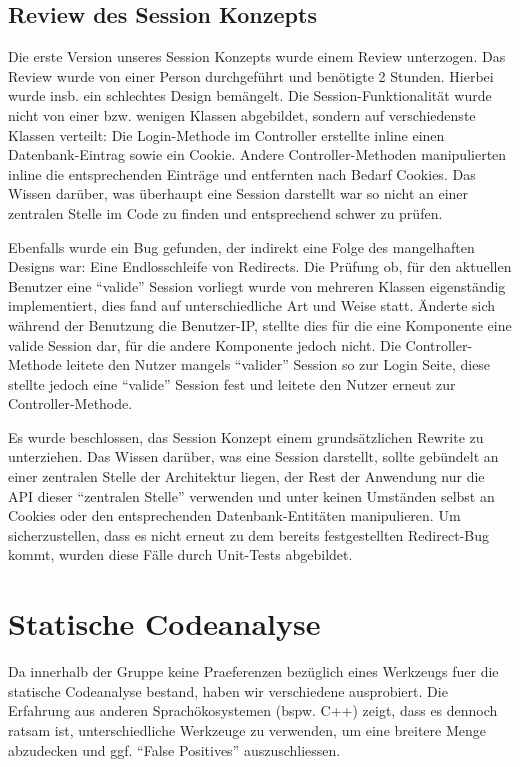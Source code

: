 \documentclass[12pt,DIV14,BCOR10mm,a4paper,twoside,parskip=half-,headsepline,headinclude,english,ngerman,bibliography=totocnumbered]{scrreprt}
\begin{document}
\subsection{Review des Session Konzepts}
Die erste Version unseres Session Konzepts wurde einem Review unterzogen. Das Review wurde von einer Person durchgeführt und benötigte 2 Stunden. Hierbei wurde insb. ein schlechtes Design bemängelt. Die Session-Funktionalität wurde nicht von einer bzw. wenigen Klassen abgebildet, sondern auf verschiedenste Klassen verteilt: Die Login-Methode im Controller erstellte inline einen Datenbank-Eintrag sowie ein Cookie. Andere Controller-Methoden manipulierten inline die entsprechenden Einträge und entfernten nach Bedarf Cookies. Das Wissen darüber, was überhaupt eine Session darstellt war so nicht an einer zentralen Stelle im Code zu finden und entsprechend schwer zu prüfen.

Ebenfalls wurde ein Bug gefunden, der indirekt eine Folge des mangelhaften Designs war: Eine Endlosschleife von Redirects. Die Prüfung ob, für den aktuellen Benutzer eine ``valide'' Session vorliegt wurde von mehreren Klassen eigenständig implementiert, dies fand auf unterschiedliche Art und Weise statt. Änderte sich während der Benutzung die Benutzer-IP, stellte dies für die eine Komponente eine valide Session dar, für die andere Komponente jedoch nicht. Die Controller-Methode leitete den Nutzer mangels ``valider'' Session so zur Login Seite, diese stellte jedoch eine ``valide'' Session fest und leitete den Nutzer erneut zur Controller-Methode.

Es wurde beschlossen, das Session Konzept einem grundsätzlichen Rewrite zu unterziehen. Das Wissen darüber, was eine Session darstellt, sollte gebündelt an einer zentralen Stelle der Architektur liegen, der Rest der Anwendung nur die API dieser ``zentralen Stelle'' verwenden und unter keinen Umständen selbst an Cookies oder den entsprechenden Datenbank-Entitäten manipulieren. Um sicherzustellen, dass es nicht erneut zu dem bereits festgestellten Redirect-Bug kommt, wurden diese Fälle durch Unit-Tests abgebildet.

\section{Statische Codeanalyse}

Da innerhalb der Gruppe keine Praeferenzen bezüglich eines Werkzeugs fuer die statische Codeanalyse bestand, haben wir verschiedene ausprobiert.
Die Erfahrung aus anderen Sprachökosystemen (bspw. C++) zeigt, dass es dennoch ratsam ist, unterschiedliche Werkzeuge zu verwenden, um eine breitere Menge abzudecken und ggf. \enquote{False Positives} auszuschliessen.
\end{document}
